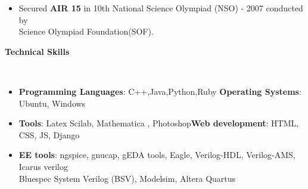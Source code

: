 \documentclass[a4paper,11pt]{article}
\newcommand{\lsep}{-0.5cm}
\newcommand{\resheading}[1]{{\small \colorbox{mygrey}{\begin{minipage}{0.975\textwidth}{\textbf{#1 \vphantom{p\^{E}}}}\end{minipage}}}}
\begin{document}
\begin{itemize}
  \item Secured \textbf{AIR 15} in 10th National Science Olympiad (NSO) - 2007 conducted by \\ Science Olympiad Foundation(SOF).
\end{itemize}

\resheading{\textbf{\large Technical Skills}}\\[\lsep]
\begin{itemize}
   \item \textbf{Programming Languages}: C++,Java,Python,Ruby \hfill \textbf{Operating Systems}: Ubuntu, Windows\\[-0.6cm]
  \item \textbf{Tools}: Latex Scilab, Mathematica , Photoshop\hfill \textbf{Web development}: HTML, CSS, JS, Django\\[-0.6cm]
  \item \textbf{EE tools}: ngspice, gnucap,  gEDA tools, Eagle, Verilog-HDL, Verilog-AMS, Icarus verilog \\ \hspace*{1.5cm} Bluespec System Verilog (BSV), Modelsim, Altera Quartus
\end{itemize}
\end{document}
